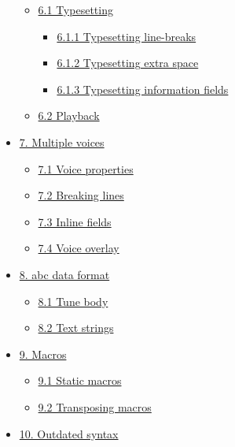 \begin{itemize}
  \begin{itemize}
  \item
    \protect\hyperlink{typesetting}{6.1 Typesetting}

    \begin{itemize}
    \item
      \protect\hyperlink{typesetting_line-breaks}{6.1.1 Typesetting
      line-breaks}
    \item
      \protect\hyperlink{typesetting_extra_space}{6.1.2 Typesetting
      extra space}
    \item
      \protect\hyperlink{typesetting_information_fields}{6.1.3
      Typesetting information fields}
    \end{itemize}
  \item
    \protect\hyperlink{playback}{6.2 Playback}
  \end{itemize}
\item
  \protect\hyperlink{multiple_voices}{7. Multiple voices}

  \begin{itemize}
  \item
    \protect\hyperlink{voice_properties}{7.1 Voice properties}
  \item
    \protect\hyperlink{breaking_lines}{7.2 Breaking lines}
  \item
    \protect\hyperlink{inline_fields}{7.3 Inline fields}
  \item
    \protect\hyperlink{voice_overlay}{7.4 Voice overlay}
  \end{itemize}
\item
  \protect\hyperlink{abc_data_format}{8. abc data format}

  \begin{itemize}
  \item
    \protect\hyperlink{tune_body}{8.1 Tune body}
  \item
    \protect\hyperlink{text_strings}{8.2 Text strings}
  \end{itemize}
\item
  \protect\hyperlink{macros}{9. Macros}

  \begin{itemize}
  \item
    \protect\hyperlink{static_macros}{9.1 Static macros}
  \item
    \protect\hyperlink{transposing_macros}{9.2 Transposing macros}
  \end{itemize}
\item
  \protect\hyperlink{outdated_syntax}{10. Outdated syntax}


\end{itemize}
